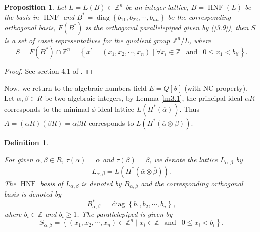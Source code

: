 \documentclass [11pt]{article}
\newtheorem{defn}[thm]{\bf Definition}
\newtheorem{prop}[thm]{\bf{Proposition}}
\begin{document}
\begin{prop}\label{pp2}
Let $L=L(B)\subset \mathbb{Z}^{n}$ be an integer lattice,  $B= \operatorname{HNF}(L)$ be  the basis in $\operatorname{HNF}$ and $B^{*}= \operatorname{diag}\left\{b_{11}, b_{22}, \cdots, b_{nn}\right\}$ be the corresponding orthogonal  basis, $F\left(B^{*}\right)$ is the
orthogonal  parallelepiped given by (\ref{3.9}), then $S$ is a set of coset representatives for the quotient group $\mathbb{Z}^{n} / L$, where
$$
S=F\left(B^{*}\right) \cap \mathbb{Z}^{n}=\left\{x^{\prime}=\left(x_{1}, x_{2}, \cdots, x_{n}\right) \mid \forall x_{i} \in \mathbb{Z}\ \
\text { and } \ \ 0 \leq x_{1}<b_{ ii}\right\}.
$$
\end{prop}

\begin{proof}
See section  4.1 of \cite{M4}.
\end{proof}


Now, we return to the algebraic numbers field $E=Q[\theta]$ (with NC-property). Let $\alpha,\beta \in R$ be two algebraic integers, by Lemma \ref{lm3.1}, the principal ideal $\alpha R$ corresponds to the minimal  $ \phi$-ideal lattice $L ( H^{*}(\overline{\alpha}))$.  Thus $A=(\alpha R)(\beta R)=\alpha \beta R$ corresponds  to $L\left( H^{*}( \overline{\alpha}\otimes \beta)\right)$.



\begin{defn}\label{df3.2}

For given $\alpha, \beta \in R$, $ \tau(\alpha)=\overline{\alpha}$ and $\tau(\beta)=\overline{\beta}$, we denote the lattice $L_{\alpha, \beta}$ by
\begin{equation}\label{3.11}
L_{\alpha, \beta}=L\left(H^{*}(\overline{\alpha} \otimes \overline{\beta})\right).
\end{equation}
The $\operatorname{HNF}$ basis of $L_{\alpha, \beta}$ is denoted by $B_{ \alpha, \beta}$ and the corresponding orthogonal basis is denoted by
\begin{equation}\label{3.12}
B_{\alpha, \beta}^{*}=\operatorname{diag}\left\{b_{1}, b_{2}, \cdots, b_{n}\right\},
\end{equation}
where  $b_{i} \in \mathbb{Z}$  and $b_{i} \geq 1$. The parallelepiped is given by
\begin{equation}\label{3.13}
S_{\alpha, \beta}=\left\{\left(x_{1}, x_{2}, \cdots, x_{n}\right) \in \mathbb{Z}^{n} \mid x_{i} \in \mathbb{Z}\ \  \text { and } \ \ 0 \leq x_{i}<b_{i}\right\}.
\end{equation}
\end{defn}
\end{document}

